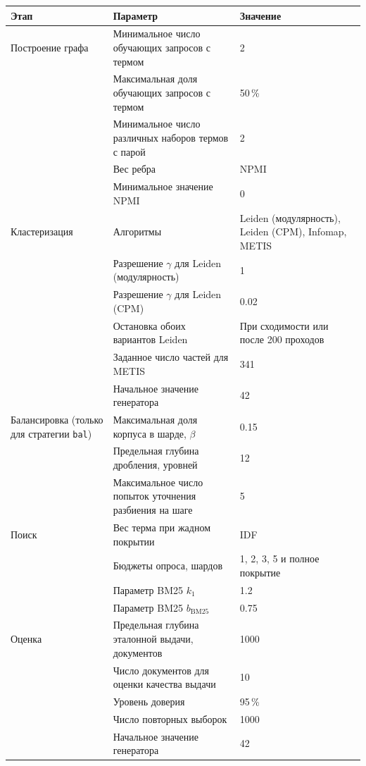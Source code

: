 \documentclass[10pt, a4paper, twoside]{article}
\newcommand{\strategy}[1]{\texttt{#1}}
\begin{document}
\noindent\begin{minipage}{\textwidth}
\captionsetup{type=table}
\label{tab:configs}
\centering\small
\setlength{\tabcolsep}{5pt}
\renewcommand{\arraystretch}{1.12}
\begin{tabular}{|L{0.17\textwidth}|L{0.43\textwidth}|L{\arrayrulewidth\relax}|}
\hline
Этап & Параметр & Значение\\
\hline
Построение графа & Минимальное число обучающих запросов с термом & 2\\
 & Максимальная доля обучающих запросов с термом & 50\,\%\\
 & Минимальное число различных наборов термов с парой & 2\\
 & Вес ребра & NPMI\\
 & Минимальное значение NPMI & 0\\
\hline
Кластеризация & Алгоритмы & Leiden (модулярность), Leiden (CPM), Infomap, METIS\\
 & Разрешение $\gamma$ для Leiden (модулярность) & 1\\
 & Разрешение $\gamma$ для Leiden (CPM) & 0.02\\
 & Остановка обоих вариантов Leiden & При сходимости или после 200 проходов\\
 & Заданное число частей для METIS & 341\\
 & Начальное значение генератора & 42\\
\hline
Балансировка (только для стратегии \strategy{bal}) & Максимальная доля корпуса в шарде, $\beta$ & 0.15\\
 & Предельная глубина дробления, уровней & 12\\
 & Максимальное число попыток уточнения разбиения на шаге & 5\\
\hline
Поиск & Вес терма при жадном покрытии & IDF\\
 & Бюджеты опроса, шардов & 1, 2, 3, 5 и полное покрытие\\
 & Параметр BM25 $k_1$ & 1.2\\
 & Параметр BM25 $b_{\mathrm{BM25}}$ & 0.75\\
\hline
Оценка & Предельная глубина эталонной выдачи, документов & 1000\\
 & Число документов для оценки качества выдачи & 10\\
 & Уровень доверия & 95\,\%\\
 & Число повторных выборок & 1000\\
 & Начальное значение генератора & 42\\
\hline
\end{tabular}
\end{minipage}
\end{document}
